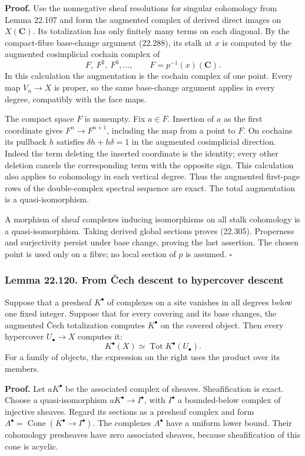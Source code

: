 \documentclass[
  11pt,
  a4paper,
]{article}
\newcounter{none} %
\begin{document}
\textbf{Proof.} Use the nonnegative sheaf resolutions for singular
cohomology from Lemma 22.107 and form the augmented complex of derived
direct images on \(X(\mathbf C)\). Its totalization has only finitely
many terms on each diagonal. By the compact-fibre base-change argument
(22.288), its stalk at \(x\) is computed by the augmented cosimplicial
cochain complex of \[
 F,\ F^2,\ F^3,\ldots,\qquad F=p^{-1}(x)(\mathbf C).
 \tag{22.306}
\] In this calculation the augmentation is the cochain complex of one
point. Every map \(V_n\to X\) is proper, so the same base-change
argument applies in every degree, compatibly with the face maps.

The compact space \(F\) is nonempty. Fix \(a\in F\). Insertion of \(a\)
as the first coordinate gives \(F^n\to F^{n+1}\), including the map from
a point to \(F\). On cochains its pullback \(h\) satisfies
\(\delta h+h\delta=1\) in the augmented cosimplicial direction. Indeed
the term deleting the inserted coordinate is the identity; every other
deletion cancels the corresponding term with the opposite sign. This
calculation also applies to cohomology in each vertical degree. Thus the
augmented first-page rows of the double-complex spectral sequence are
exact. The total augmentation is a quasi-isomorphism.

A morphism of sheaf complexes inducing isomorphisms on all stalk
cohomology is a quasi-isomorphism. Taking derived global sections proves
(22.305). Properness and surjectivity persist under base change, proving
the last assertion. The chosen point is used only on a fibre; no local
section of \(p\) is assumed. \(\square\)

\subsubsection{Lemma 22.120. From Čech descent to hypercover
descent}\label{lemma-22.120.-from-ux10dech-descent-to-hypercover-descent}

Suppose that a presheaf \(K^\bullet\) of complexes on a site vanishes in
all degrees below one fixed integer. Suppose that for every covering and
its base changes, the augmented Čech totalization computes \(K^\bullet\)
on the covered object. Then every hypercover \(U_\bullet\to X\) computes
it: \[
 K^\bullet(X)\simeq
       \operatorname{Tot}K^\bullet(U_\bullet).
 \tag{22.307}
\] For a family of objects, the expression on the right uses the product
over its members.

\textbf{Proof.} Let \(aK^\bullet\) be the associated complex of sheaves.
Sheafification is exact. Choose a quasi-isomorphism
\(aK^\bullet\to I^\bullet\), with \(I^\bullet\) a bounded-below complex
of injective sheaves. Regard its sections as a presheaf complex and form
\(A^\bullet=\operatorname{Cone}(K^\bullet\to I^\bullet)\). The complexes
\(A^\bullet\) have a uniform lower bound. Their cohomology presheaves
have zero associated sheaves, because sheafification of this cone is
acyclic.
\end{document}
